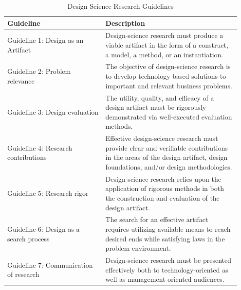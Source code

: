 \documentclass[../Main/thesis.tex]{subfiles}
\begin{document}
\begin{table}[h]
\centering
\caption[Design Science Research Guidelines]{Design Science Research Guidelines\citep[p.83]{hevner2004design}}
\begin{tabular}{|p{0.4\linewidth}|p{0.55\linewidth}|}
	\hline
	\textbf{Guideline} & \textbf{Description} \\ \hline
	Guideline 1: Design as an Artifact & Design-science research must produce a viable artifact in the form of a construct, a model, a method, or an instantiation. \\ \hline
	Guideline 2: Problem relevance & The objective of design-science research is to develop technology-based solutions to important and relevant business problems. \\ \hline
	Guideline 3: Design evaluation & The utility, quality, and efficacy of a design artifact must be rigorously demonstrated via well-executed evaluation methods. \\ \hline
	Guideline 4: Research contributions & Effective design-science research must provide clear and verifiable contributions in the areas of the design artifact, design foundations, and/or design methodologies. \\ \hline
	Guideline 5: Research rigor & Design-science research relies upon the application of rigorous methods in both the construction and evaluation of the design artifact. \\ \hline
	Guideline 6: Design as a search process & The search for an effective artifact requires utilizing available means to reach desired ends while satisfying laws in the problem environment. \\ \hline
	Guideline 7: Communication of research & Design-science research must be presented effectively both to technology-oriented as well as management-oriented audiences. \\ \hline
\end{tabular}
\label{tab:design-science-guidelines}
\end{table}
\end{document}

